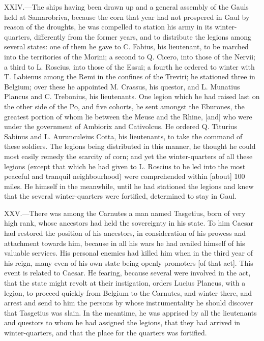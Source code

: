 XXIV.—The ships having been drawn up and a general assembly of the
Gauls held at Samarobriva, because the corn that year had not prospered
in Gaul by reason of the droughts, he was compelled to station his army
in its winter-quarters, differently from the former years, and to
distribute the legions among several states: one of them he gave to C.
Fabius, his lieutenant, to be marched into the territories of the
Morini; a second to Q. Cicero, into those of the Nervii; a third to L.
Roscius, into those of the Essui; a fourth he ordered to winter with T.
Labienus among the Remi in the confines of the Treviri; he stationed
three in Belgium; over these he appointed M. Crassus, his questor, and
L. Munatius Plancus and C. Trebonius, his lieutenants. One legion which
he had raised last on the other side of the Po, and five cohorts, he
sent amongst the Eburones, the greatest portion of whom lie between the
Meuse and the Rhine, [and] who were under the government of Ambiorix and
Cativolcus. He ordered Q. Titurius Sabinus and L. Aurunculeius Cotta,
his lieutenants, to take the command of these soldiers. The legions
being distributed in this manner, he thought he could most easily remedy
the scarcity of corn; and yet the winter-quarters of all these legions
(except that which he had given to L. Roscius to be led into the most
peaceful and tranquil neighbourhood) were comprehended within [about]
100 miles. He himself in the meanwhile, until he had stationed the
legions and knew that the several winter-quarters were fortified,
determined to stay in Gaul.

XXV.—There was among the Carnutes a man named Tasgetius, born of very
high rank, whose ancestors had held the sovereignty in his state. To him
Caesar had restored the position of his ancestors, in consideration of
his prowess and attachment towards him, because in all his wars he had
availed himself of his valuable services. His personal enemies had
killed him when in the third year of his reign, many even of his own
state being openly promoters [of that act]. This event is related to
Caesar. He fearing, because several were involved in the act, that the
state might revolt at their instigation, orders Lucius Plancus, with a
legion, to proceed quickly from Belgium to the Carnutes, and winter
there, and arrest and send to him the persons by whose instrumentality
he should discover that Tasgetius was slain. In the meantime, he was
apprised by all the lieutenants and questors to whom he had assigned the
legions, that they had arrived in winter-quarters, and that the place
for the quarters was fortified.

